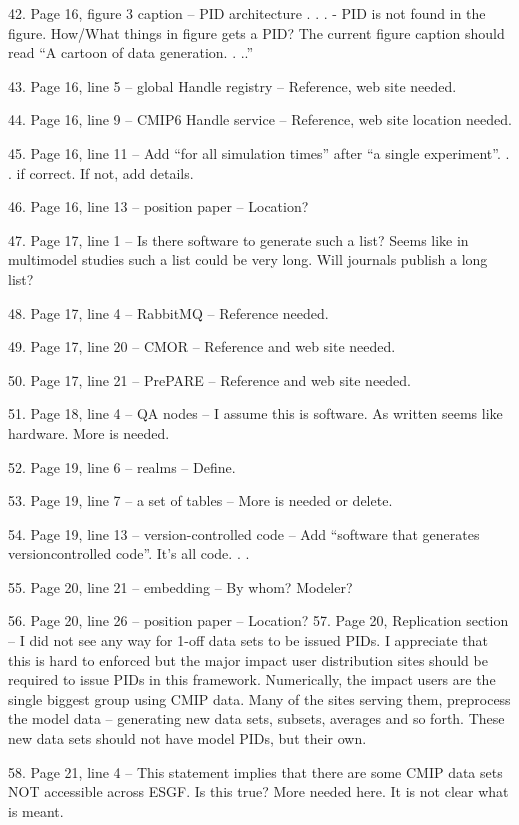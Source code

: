 \documentclass[gmd,manuscript]{copernicus}
\begin{document}
42. Page 16, figure 3 caption – PID architecture . . . - PID is not
found in the figure. How/What things in figure gets a PID? The current
figure caption should read “A cartoon of data generation. . ..”

43. Page 16, line 5 – global Handle registry – Reference, web site
needed.

44. Page 16, line 9 – CMIP6 Handle service – Reference, web site
location needed.

45. Page 16, line 11 – Add “for all simulation times” after “a single
experiment”. . . if correct. If not, add details.

46. Page 16, line 13 – position paper – Location?

47. Page 17, line 1 – Is there software to generate such a list? Seems
like in multimodel studies such a list could be very long. Will
journals publish a long list?

48. Page 17, line 4 – RabbitMQ – Reference needed.

49. Page 17, line 20 – CMOR – Reference and web site needed.

50. Page 17, line 21 – PrePARE – Reference and web site needed.

51. Page 18, line 4 – QA nodes – I assume this is software. As written
seems like hardware. More is needed.

52. Page 19, line 6 – realms – Define.

53. Page 19, line 7 – a set of tables – More is needed or delete.

54. Page 19, line 13 – version-controlled code – Add “software that
generates versioncontrolled code”. It’s all code. . .

55. Page 20, line 21 – embedding – By whom? Modeler?

56. Page 20, line 26 – position paper – Location? 57. Page 20,
Replication section – I did not see any way for 1-off data sets to be
issued PIDs. I appreciate that this is hard to enforced but the major
impact user distribution sites should be required to issue PIDs in
this framework. Numerically, the impact users are the single biggest
group using CMIP data. Many of the sites serving them, preprocess the
model data – generating new data sets, subsets, averages and so forth.
These new data sets should not have model PIDs, but their own.

58. Page 21, line 4 – This statement implies that there are some CMIP
data sets NOT accessible across ESGF. Is this true? More needed here.
It is not clear what is meant.
\end{document}
